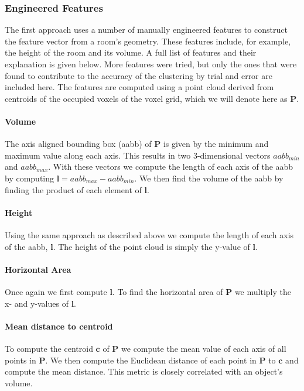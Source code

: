 \subsubsection{Engineered Features}
The first approach uses a number of manually engineered features to construct the feature vector from a room's geometry. These features include, for example, the height of the room and its volume. A full list of features and their explanation is given below. More features were tried, but only the ones that were found to contribute to the accuracy of the clustering by trial and error are included here. The features are computed using a point cloud derived from centroids of the occupied voxels of the voxel grid, which we will denote here as \(\mathbf{P}\).

\paragraph{Volume}
The axis aligned bounding box (aabb) of \(\mathbf{P}\) is given by the minimum and maximum value along each axis. This results in two 3-dimensional vectors \(aabb_{min}\) and \(aabb_{max}\). With these vectors we compute the length of each axis of the aabb by computing \(\mathbf{l} = aabb_{max} - aabb_{min}\). We then find the volume of the aabb by finding the product of each element of \(\mathbf{l}\).

\paragraph{Height} 
Using the same approach as described above we compute the length of each axis of the aabb, \(\mathbf{l}\). The height of the point cloud is simply the y-value of \(\mathbf{l}\).

\paragraph{Horizontal Area} 
Once again we first compute \(\mathbf{l}\). To find the horizontal area of \(\mathbf{P}\) we multiply the x- and y-values of \(\mathbf{l}\). 

\paragraph{Mean distance to centroid} 
To compute the centroid \(\mathbf{c}\) of \(\mathbf{P}\) we compute the mean value of each axis of all points in \(\mathbf{P}\). We then compute the Euclidean distance of each point in \(\mathbf{P}\) to \(\mathbf{c}\) and compute the mean distance. This metric is closely correlated with an object's volume. 

